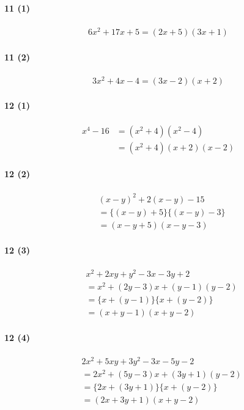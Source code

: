 \documentclass[fleqn,a4j,dvipdfmx,uplatex,twocolumn]{jsarticle}
\begin{document}
\paragraph{11 (1)}
\begin{align*}
  6 x^{2}+17 x+5 = (2 x+5)(3 x+1)
\end{align*}

\paragraph{11 (2)}
\begin{align*}
  3 x^{2}+4 x-4 = (3 x-2)(x+2)
\end{align*}

\paragraph{12 (1)}
\begin{align*}
  x^{4}-16 &= (x^{2}+4)(x^{2}-4) \\
  &= (x^{2}+4)(x+2)(x-2)
\end{align*}

\paragraph{12 (2)}
\begin{align*}
  & (x-y)^{2}+2(x-y)-15 \\
  &= \{(x-y)+5\}\{(x-y)-3\} \\
  &= (x-y+5)(x-y-3)
\end{align*}

\paragraph{12 (3)}
\begin{align*}
  & x^{2}+2 x y+y^{2}-3 x-3 y+2 \\
  &= x^{2}+(2 y-3) x+(y-1)(y-2) \\
  &= \{x+(y-1)\}\{x+(y-2)\} \\
  &= (x+y-1)(x+y-2)
\end{align*}

\paragraph{12 (4)}
\begin{align*}
  & 2 x^{2}+5 x y+3 y^{2}-3 x-5 y-2 \\
  &= 2 x^{2}+(5 y-3) x+(3 y+1)(y-2) \\
  &= \{2 x+(3 y+1)\}\{x+(y-2)\} \\
  &= (2 x+3 y+1)(x+y-2)
\end{align*}
\end{document}
